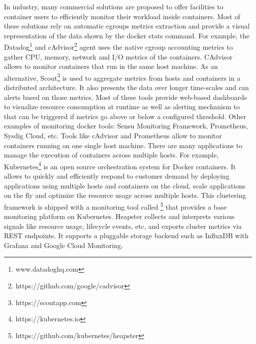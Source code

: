 In industry, many commercial solutions are proposed to offer facilities to container users to efficiently monitor their workload inside containers. Most of these solutions rely on automatic cgroups metrics extraction and provide a visual representation of the data shown by the docker stats command. For example, the Datadog\footnote{www.datadoghq.com} and cAdvisor\footnote{https://github.com/google/cadvisor} agent uses the native cgroup accounting metrics to gather CPU, memory, network and I/O metrics of the containers. CAdvisor allows to monitor containers that run in the same host machine. As an alternative, Scout\footnote{https://scoutapp.com} is used to aggregate metrics from  hosts and containers in a distributed architecture. It also presents the data over longer time-scales and can  alerts based on those metrics. 
Most of these tools provide web-based dashboards to visualize resource consumption at runtime as well as alerting mechanism to that can be triggered if metrics go above or below a configured threshold. Other examples of monitoring docker tools: Sensu Monitoring Framework, Prometheus, Sysdig Cloud, etc.
Tools like cAdvisor and Prometheus allow to monitor containers running on one single host machine. 
There are many applications to manage the execution of containers across multiple hosts. For example, Kubernetes\footnote{https://kubernetes.io} is an open source orchestration system for Docker containers. It allows to quickly and efficiently respond to customer demand by deploying applications using multiple hosts and containers on the cloud, scale applications on the fly and optimize the resource usage across multiple hosts. This clustering framework is shipped with a monitoring tool called \footnote{https://github.com/kubernetes/heapster} that provides a base monitoring platform on Kubernetes. Heapster collects and interprets various signals like resource usage, lifecycle events, etc, and exports cluster metrics via REST endpoints. It supports a pluggable storage backend such as InfluxDB with Grafana and Google Cloud Monitoring.


